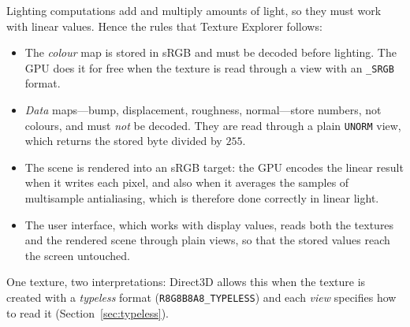 Lighting computations add and multiply amounts of light, so they must work with linear values.
Hence the rules that Texture Explorer follows:
\begin{itemize}
\item The \emph{colour} map is stored in sRGB and must be decoded before lighting. The GPU does
it for free when the texture is read through a view with an \texttt{\_SRGB} format.
\item \emph{Data} maps---bump, displacement, roughness, normal---store numbers, not colours,
and must \emph{not} be decoded. They are read through a plain \texttt{UNORM} view, which
returns the stored byte divided by $255$.
\item The scene is rendered into an sRGB target: the GPU encodes the linear result when it
writes each pixel, and also when it averages the samples of multisample antialiasing, which is
therefore done correctly in linear light.
\item The user interface, which works with display values, reads both the textures and the
rendered scene through plain views, so that the stored values reach the screen untouched.
\end{itemize}
One texture, two interpretations: Direct3D allows this when the texture is created with a
\emph{typeless} format (\texttt{R8G8B8A8\_TYPELESS}) and each \emph{view} specifies how to read
it (Section~\ref{sec:typeless}).
